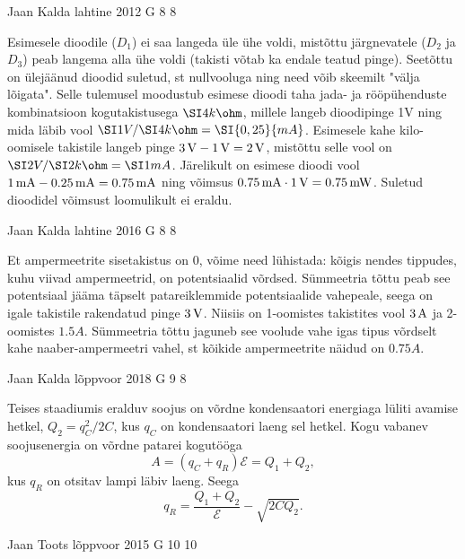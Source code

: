 \documentclass[11pt, twoside]{article}
\begin{document}
{%
{Jaan Kalda} %
{lahtine} %
{2012} %
{G 8} %
{8} %
{

\ifSolution
Esimesele dioodile ($D_1$) ei saa langeda üle ühe voldi, mistõttu järgnevatele ($D_2$ ja $D_3$) peab langema alla ühe voldi (takisti võtab ka endale teatud pinge).
Seetõttu on ülejäänud dioodid suletud, st nullvooluga ning need võib skeemilt "välja lõigata". Selle tulemusel moodustub esimese dioodi taha 
jada- ja rööpühenduste kombinatsioon kogutakistusega $\SI 4{k\ohm}$, millele langeb dioodipinge 1V ning mida läbib vool $\SI 1V /\SI 4{k\ohm}= \SI {0,25}{mA}$. 
Esimesele kahe kilo-oomisele takistile langeb pinge $\SI 3V-\SI 1V=\SI 2V$, mistõttu selle vool on $\SI 2V/\SI 2{k\ohm}=\SI 1{mA}$. Järelikult on esimese dioodi vool
$\SI 1{mA}-\SI {0,25}{mA}=\SI{0,75}{mA}$ ning võimsus $\SI{0,75}{mA}\cdot \SI 1V=\SI{0,75}{mW}$. Suletud dioodidel võimsust loomulikult ei eraldu.
\fi
}

{Jaan Kalda} %
{lahtine} %
{2016} %
{G 8} %
{8} %
{

\ifSolution
Et ampermeetrite sisetakistus on \num{0}, võime need lühistada: kõigis nendes tippudes, kuhu viivad ampermeetrid, on potentsiaalid võrdsed. Sümmeetria tõttu peab see 
potentsiaal jääma täpselt patareiklemmide potentsiaalide vahepeale, seega on igale takistile rakendatud pinge
$\SI 3V$. Niisiis on 1-oomistes takistites vool $\SI 3A$ ja 2-oomistes $\SI {1.5}A$. Sümmeetria tõttu 
jaguneb see voolude vahe igas tipus võrdselt kahe naaber-ampermeetri vahel, st kõikide ampermeetrite näidud on 
$\SI {0.75}A$.
\fi
}

{Jaan Kalda} %
{lõppvoor} %
{2018} %
{G 9} %
{8} %
{

\ifSolution
Teises staadiumis eralduv soojus on võrdne kondensaatori energiaga lüliti avamise hetkel, $Q_2=q_C^2/2C$, kus $q_C$ on kondensaatori laeng sel hetkel. Kogu vabanev soojusenergia on võrdne patarei kogutööga
\[
A=(q_C+q_R)\mathcal E=Q_1+Q_2,
\]
kus $q_R$ on otsitav lampi läbiv laeng. Seega
\[
q_R=\frac{Q_1+Q_2}{\mathcal E}-\sqrt{2CQ_2}.
\]
\fi
}

{Jaan Toots} %
{lõppvoor} %
{2015} %
{G 10} %
{10} %
{

}}
\end{document}
